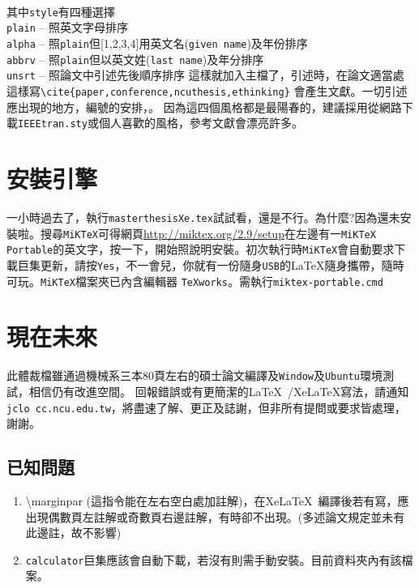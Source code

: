 \begin{Verbatim}[frame=single,rulecolor=\color{red},label=Add this]


\end{Verbatim}
其中{\tt style}有四種選擇\\ %
{\tt plain} -- 照英文字母排序\\
{\tt alpha} -- 照{\tt plain}但[1,2,3,4]用英文名({\tt given name})及年份排序\\
{\tt abbrv} -- 照{\tt plain}但以英文姓({\tt last name})及年分排序\\
{\tt unsrt} -- 照論文中引述先後順序排序
這樣就加入主檔了，引述時，在論文適當處這樣寫\verb+\cite{paper,conference,ncuthesis,ethinking}+
會產生文獻\cite{paper,conference,ncuthesis,ethinking}。一切引述應出現的地方，編號的安排，。
因為這四個風格都是最陽春的，建議採用從網路下載{\tt IEEEtran.sty}或個人喜歡的風格，參考文獻會漂亮許多。


\section{安裝引擎}

一小時過去了，執行{\tt masterthesisXe.tex}試試看，還是不行。為什麼?因為還未安裝啦。搜尋{\tt MiKTeX}可得網頁\url{http://miktex.org/2.9/setup}在左邊有一{\tt MiKTeX Portable}的英文字，按一下，開始照說明安裝。初次執行時{\tt MiKTeX}會自動要求下載巨集更新，請按{\tt Yes}，不一會兒，你就有一份隨身{\tt USB}的\LaTeX{}隨身攜帶，隨時可玩。{\tt MiKTeX}檔案夾已內含編輯器 {\tt TeXworks}。需執行{\tt miktex-portable.cmd}



\section{現在未來}
此體裁檔雖通過機械系三本80頁左右的碩士論文編譯及{\tt Window}及{\tt Ubuntu}環境測試，相信仍有改進空間。 回報錯誤或有更簡潔的\LaTeX\ /Xe\LaTeX{}寫法，請通知{\tt jclo cc.ncu.edu.tw}，將盡速了解、更正及誌謝，但非所有提問或要求皆處理，謝謝。

\subsection{已知問題}
\begin{enumerate}
\item \textbackslash marginpar (這指令能在左右空白處加註解)，在Xe\LaTeX\ 編譯後若有寫，應出現偶數頁左註解或奇數頁右邊註解，有時卻不出現。(多述論文規定並未有此邊註，故不影響)
\item {\tt calculator}巨集應該會自動下載，若沒有則需手動安裝。目前資料夾內有該檔案。
\end{enumerate}

